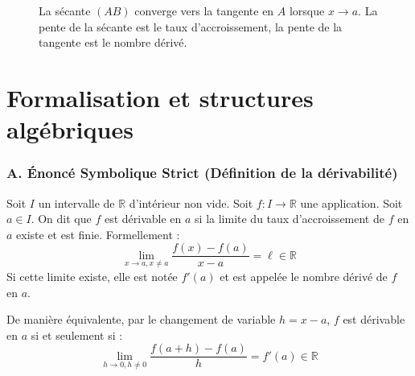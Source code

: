 \documentclass[11pt,a4paper]{article}
\begin{document}
\begin{figure}[h]
\centering
{}
\caption{La sécante $(AB)$ converge vers la tangente en $A$ lorsque $x \to a$. La pente de la sécante est le taux d'accroissement, la pente de la tangente est le nombre dérivé.}
\end{figure}

\section{Formalisation et structures algébriques}


\subsubsection*{A. Énoncé Symbolique Strict (Définition de la dérivabilité)}

Soit $I$ un intervalle de $\mathbb{R}$ d'intérieur non vide. Soit $f : I \to \mathbb{R}$ une application. Soit $a \in I$.
On dit que $f$ est dérivable en $a$ si la limite du taux d'accroissement de $f$ en $a$ existe et est finie. Formellement :
\[  \lim_{x \to a, x \neq a} \frac{f(x) - f(a)}{x - a} = \ell \in \mathbb{R}  \]
Si cette limite existe, elle est notée $f'(a)$ et est appelée le nombre dérivé de $f$ en $a$.

De manière équivalente, par le changement de variable $h = x - a$, $f$ est dérivable en $a$ si et seulement si :
\[  \lim_{h \to 0, h \neq 0} \frac{f(a+h) - f(a)}{h} = f'(a) \in \mathbb{R}  \]
\end{document}
